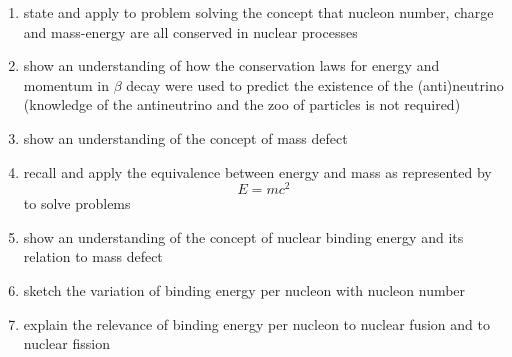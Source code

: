 \documentclass[a4paper]{article}
\begin{document}
\begin{enumerate}[label=(\alph*)]
    \[
        {}^{14}_{7}\mathrm{N} + {}^{4}_{2}\mathrm{He} \rightarrow {}^{17}_{8}\mathrm{O} + {}^{1}_{1}\mathrm{H}
    \]
    \item state and apply to problem solving the concept that nucleon number, charge and mass-energy are all conserved in nuclear processes
    \item show an understanding of how the conservation laws for energy and momentum in $\beta$ decay were used to predict the existence of the (anti)neutrino (knowledge of the antineutrino and the zoo of particles is not required)
    \item show an understanding of the concept of mass defect
    \item recall and apply the equivalence between energy and mass as represented by
    \[
        E = mc^2
    \]
    to solve problems
    \item show an understanding of the concept of nuclear binding energy and its relation to mass defect
    \item sketch the variation of binding energy per nucleon with nucleon number
    \item explain the relevance of binding energy per nucleon to nuclear fusion and to nuclear fission
\end{enumerate}
\end{document}
